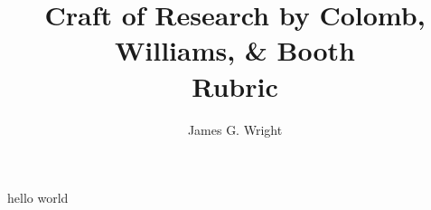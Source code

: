 \documentclass[10pt, a4paper]{article}
\begin{document}
\title{Craft of Research by Colomb, Williams, \& Booth\cite{booth2009craft}
	\\Rubric}
\author{James G. Wright }
\maketitle
hello world



\end{document}
